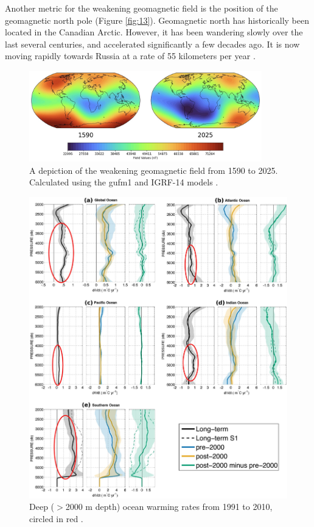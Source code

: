 \documentclass[10pt,twocolumn,letterpaper]{article}
\begin{document}
Another metric for the weakening geomagnetic field is the position of the geomagnetic north pole (Figure \ref{fig:13}). Geomagnetic north has historically been located in the Canadian Arctic. However, it has been wandering slowly over the last several centuries, and accelerated significantly a few decades ago. It is now moving rapidly towards Russia at a rate of 55 kilometers per year \cite{124}.

\begin{figure}[t]
\begin{center}
\includegraphics[width=0.9\textwidth]{saa.jpg}
\end{center}
   \caption{A depiction of the weakening geomagnetic field from 1590 to 2025. Calculated using the gufm1 and IGRF-14 models \cite{125,126}.}
\label{fig:14}
\end{figure}

\begin{figure}[t]
\begin{center}
   \includegraphics[width=1\linewidth]{ocean-highlight.jpg}
\end{center}
   \caption{Deep ($>$2000 m depth) ocean warming rates from 1991 to 2010, circled in red \cite{132}.}
\label{fig:15}
\label{fig:onecol}
\end{figure}
\end{document}
